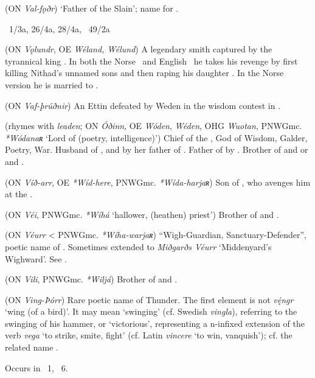 \begin{itemize}
 (ON \emph{Val-fǫðr})
  ‘Father of the Slain’; name for .

  \Voluspa\ 1/3a, 26/4a, 28/4a, \Grimnismal\ 49/2a

 (ON \emph{Vǫlundr}, OE \emph{Wéland, Wélund})
  A legendary smith captured by the tyrannical king .  In both the Norse \Volundarkvida\ and English \Deor\ he takes his revenge by first killing Nithad’s unnamed sons and then raping his daughter .  In the Norse version he is married to .

 (ON \emph{Vaf-þrúðnir})
  An Ettin defeated by Weden in the wisdom contest in \Vafthrudnismal.

 (rhymes with \emph{leaden}; ON \emph{Óðinn}, OE \emph{Wóden}, \emph{Wéden}, OHG \emph{Wuotan}, PNWGmc. \emph{*Wódanaʀ} ‘Lord of  (poetry, intelligence)’)
  Chief of the , God of Wisdom, Galder, Poetry, War.  Husband of , and by her father of .  Father of  by .  Brother of  and  or  and .

 (ON \emph{Víð-arr}, OE \emph{*Wíd-here}, PNWGmc. \emph{*Wída-harjaʀ})
  Son of , who avenges him at the .

 (ON \emph{Véi}, PNWGmc. \emph{*Wíhá} ‘hallower, (heathen) priest’)
  Brother of  and .

 (ON \emph{Véurr} < PNWGmc. \emph{*Wíha-warjaʀ})
  “Wigh-Guardian, Sanctuary-Defender”, poetic name of .  Sometimes extended to \emph{Miðgarðs Véurr} ‘Middenyard’s Wighward’.  See .

 (ON \emph{Vili}, PNWGmc. \emph{*Wiljá})
  Brother of  and .

 (ON \emph{Ving-Þórr})
  Rare poetic name of Thunder.  The first element is not \emph{vę́ngr} ‘wing (of a bird)’.  It may mean ‘swinging’ (cf. Swedish \emph{vingla}), referring to the swinging of his hammer, or ‘victorious’, representing a n-infixed extension of the verb \emph{vega} ‘to strike, smite, fight’ (cf. Latin \emph{vincere} ‘to win, vanquish’); cf. the related name .

  Occurs in \Thrymskvida\ 1, \Allvismal\ 6.


\end{itemize}
